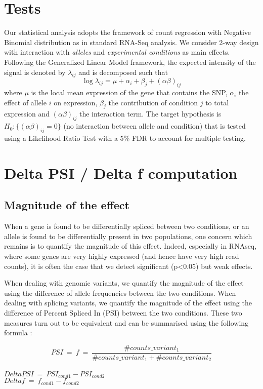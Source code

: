 \documentclass[english, a4paper, 12pt]{article}
\begin{document}
\section{Tests}
Our statistical analysis adopts the framework of count regression with Negative Binomial distribution as in standard RNA-Seq analysis. We consider 2-way design with interaction with \textit{alleles} and \textit{experimental conditions} as main effects. Following the Generalized Linear Model framework, the expected intensity of the signal is denoted by $\lambda_{ij}$ and is decomposed such that
$$
\log \lambda_{ij} = \mu + \alpha_{i} +\beta_{j} + \left(\alpha \beta \right)_{ij}
$$
where $\mu$ is the local mean expression of the gene that contains the SNP, $\alpha_{i}$ the effect of allele $i$ on expression, $\beta_{j}$ the contribution of condition $j$ to total expression and $\left(\alpha \beta \right)_{ij}$ the interaction term. The target hypothesis is $H_0:\{\left(\alpha \beta \right)_{ij}=0\}$ (no interaction between allele and condition) that is tested using a Likelihood Ratio Test with a 5\% FDR to account for multiple testing.

\section{Delta PSI / Delta f computation}
\subsection{Magnitude of the effect}
When a gene is found to be differentially spliced between two conditions, or an allele is found to be differentially present in two populations, one concern which remains is to quantify the magnitude of this effect.
Indeed, especially in RNAseq, where some genes are very highly expressed (and hence have very high read counts), it is often the case that we detect significant (p<0.05) but weak effects. 

When dealing with genomic variants, we quantify the magnitude of the effect using the difference of allele frequencies between the two conditions.
When dealing with splicing variants, we quantify the magnitude of the effect using the difference of Percent Spliced In (PSI) between the two conditions.
These two measures turn out to be equivalent and can be summarised using the following formula :

$$PSI \:=\: f  \:=\:  \frac{\#counts\_variant_1}{\#counts\_variant_1 + \#counts\_variant_2} $$ \\
$DeltaPSI \:=\: PSI_{cond1} - PSI_{cond2}$ \\
$Deltaf \:=\: f_{cond1} - f_{cond2}$
\end{document}
